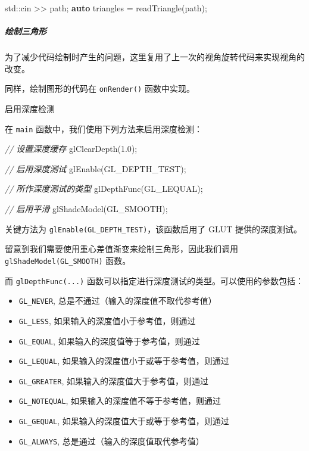 \documentclass[
]{article}
\newenvironment{Shaded}{}{}
\newcommand{\BuiltInTok}[1]{#1}
\newcommand{\CommentTok}[1]{\textcolor[rgb]{0.38,0.63,0.69}{\textit{#1}}}
\newcommand{\FloatTok}[1]{\textcolor[rgb]{0.25,0.63,0.44}{#1}}
\newcommand{\KeywordTok}[1]{\textcolor[rgb]{0.00,0.44,0.13}{\textbf{#1}}}
\newcommand{\NormalTok}[1]{#1}
\begin{document}
\begin{Shaded}
\begin{Highlighting}[]
\BuiltInTok{std::}\NormalTok{cin >> path;}
\KeywordTok{auto}\NormalTok{ triangles = readTriangle(path);}
\end{Highlighting}
\end{Shaded}

\hypertarget{header-n42}{%
\subparagraph{绘制三角形}\label{header-n42}}

为了减少代码绘制时产生的问题，这里复用了上一次的视角旋转代码来实现视角的改变。

同样，绘制图形的代码在 \texttt{onRender()} 函数中实现。

启用深度检测

在 \texttt{main} 函数中，我们使用下列方法来启用深度检测：

\begin{Shaded}
\begin{Highlighting}[]
\CommentTok{// 设置深度缓存}
\NormalTok{glClearDepth(}\FloatTok{1.0}\NormalTok{);}

\CommentTok{// 启用深度测试}
\NormalTok{glEnable(GL_DEPTH_TEST);}

\CommentTok{// 所作深度测试的类型}
\NormalTok{glDepthFunc(GL_LEQUAL);}

\CommentTok{// 启用平滑}
\NormalTok{glShadeModel(GL_SMOOTH);}
\end{Highlighting}
\end{Shaded}

关键方法为 \texttt{glEnable(GL\_DEPTH\_TEST)}，该函数启用了 GLUT
提供的深度测试。

留意到我们需要使用重心差值渐变来绘制三角形，因此我们调用
\texttt{glShadeModel(GL\_SMOOTH)} 函数。

而 \texttt{glDepthFunc(...)}
函数可以指定进行深度测试的类型。可以使用的参数包括：

\begin{itemize}
\item
  \texttt{GL\_NEVER}, 总是不通过（输入的深度值不取代参考值）
\item
  \texttt{GL\_LESS}, 如果输入的深度值小于参考值，则通过
\item
  \texttt{GL\_EQUAL}, 如果输入的深度值等于参考值，则通过
\item
  \texttt{GL\_LEQUAL}, 如果输入的深度值小于或等于参考值，则通过
\item
  \texttt{GL\_GREATER}, 如果输入的深度值大于参考值，则通过
\item
  \texttt{GL\_NOTEQUAL}, 如果输入的深度值不等于参考值，则通过
\item
  \texttt{GL\_GEQUAL}, 如果输入的深度值大于或等于参考值，则通过
\item
  \texttt{GL\_ALWAYS}, 总是通过（输入的深度值取代参考值）
\end{itemize}
\end{document}
